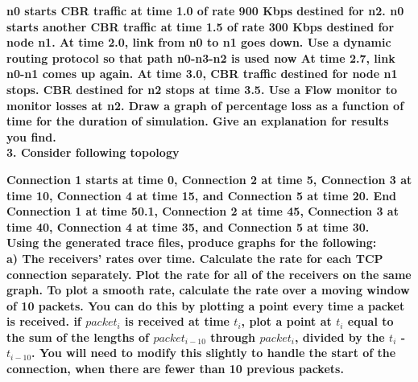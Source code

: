 \documentclass[11pt]{article}
\numberwithin{equation}{section}
\begin{document}
\textbf{n0 starts CBR traffic at time 1.0 of rate 900 Kbps destined for n2. n0 starts another CBR traffic at time 1.5 of rate 300 Kbps destined for node n1. At time 2.0, link from n0 to n1 goes down. Use a dynamic routing protocol so that path n0-n3-n2 is used now At time 2.7, link n0-n1 comes up again. At time 3.0, CBR traffic destined for node n1 stops. CBR destined for n2 stops at time 3.5. Use a  Flow monitor to monitor losses at n2. Draw a graph of percentage loss as a function of time for the duration of simulation. Give an explanation for results you find. }\\

\textbf{3. Consider following topology}\\


\begin{figure}[H]
\begin{center}
		\centering
		\label{fig:q1_f1_a}
\end{center}
\end{figure}
 
\textbf{Connection 1 starts at time 0, Connection 2 at time 5, Connection 3 at time 10, Connection 4 at time 15, and Connection 5 at time 20. End Connection 1 at time 50.1, Connection 2 at time 45, Connection 3 at time 40, Connection 4 at time 35, and Connection 5 at time 30.}\\

\textbf{Using the generated trace files, produce graphs for the following:}\\

\textbf{a) The receivers' rates over time. Calculate the rate for each TCP connection separately. Plot the rate for all of the receivers on the same graph. To plot a smooth rate, calculate the rate over a moving window of 10 packets. You can do this by plotting a point every time a packet is received. if $packet_i$ is received at time $t_i$, plot a point at $t_i$ equal to the sum of the lengths of $packet_{i-10}$ through $packet_i$, divided by the $t_i$ - $t_{i-10}$. You will need to modify this slightly to handle the start of the connection, when there are fewer than 10 previous packets.}\\
\end{document}
